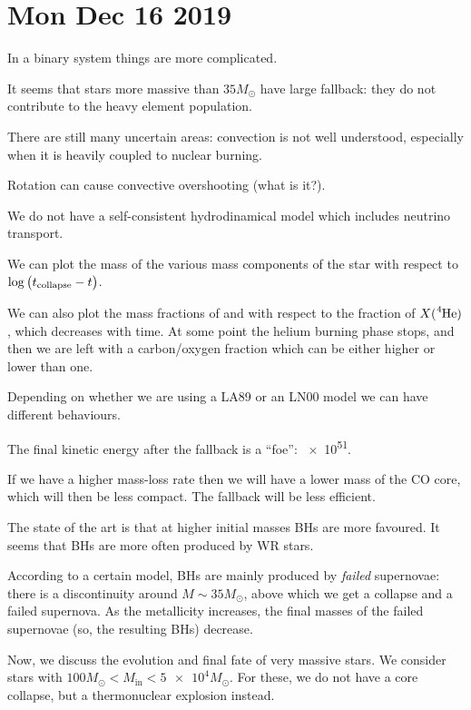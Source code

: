 \documentclass[main.tex]{subfiles}
\begin{document}
\section*{Mon Dec 16 2019}

In a binary system things are more complicated. 

It seems that stars more massive than \(35 M_{\odot}\) have large fallback: they do not contribute to the heavy element population. 

There are still many uncertain areas: convection is not well understood, especially when it is heavily coupled to nuclear burning. 

Rotation can cause convective overshooting (what is it?). 

We do not have a self-consistent hydrodinamical model which includes neutrino transport. 

We can plot the mass of the various mass components of the star with respect to \(\log \qty(t _{\text{collapse}} - t)\). 

We can also plot the mass fractions of  and  with respect to the fraction of \(X(\ce{^{4}He})\), which decreases with time. At some point the helium burning phase stops, and then we are left with a carbon/oxygen fraction which can be either higher or lower than one. 

Depending on whether we are using a LA89 or an LN00 model we can have different behaviours. 

The final kinetic energy after the fallback is a ``foe'': \SI{e51}{\erg}. 

If we have a higher mass-loss rate then we will have a lower mass of the CO core, which will then be less compact. The fallback will be less efficient.

The state of the art is that at higher initial masses BHs are more favoured. 
It seems that BHs are more often produced by WR stars.

According to a certain model, BHs are mainly produced by \emph{failed} supernovae: there is a discontinuity around \(M \sim 35 M_{\odot}\), above which we get a collapse and a failed supernova. 
As the metallicity increases, the final masses of the failed supernovae (so, the resulting BHs) decrease. 

Now, we discuss the evolution and final fate of very massive stars. 
We consider stars with \(100 M_{\odot} < M _{\text{in}} < \num{5e4}M_{\odot}\). 
For these, we do not have a core collapse, but a thermonuclear explosion instead. 
\end{document}
